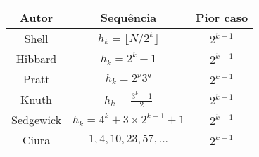 
\begin{landscape}
\begin{table}[!h]
\centering
{}
\begin{tabular}{c|c|c}
    Autor & Sequência & Pior caso \\
    \hline
    Shell \cite{shell1959high} & \( h_k = \lfloor N/2^k \rfloor \) & $2^{k-1}$ \\
    \hline
    Hibbard \cite{hibbard1963empirical} & \( h_k = 2^k - 1 \) & $2^{k-1}$ \\
    \hline
    Pratt \cite{pratt1972shellsort} & \( h_k = 2^p 3^q \) & $2^{k-1}$ \\
    \hline
    Knuth \cite{knuth1973art} & \( h_k = \frac{3^k - 1}{2} \) & $2^{k-1}$ \\
    \hline
    Sedgewick \cite{sedgewick1986new} & \( h_k = 4^k + 3 \times 2^{k-1} + 1 \) & $2^{k-1}$ \\
    \hline
    Ciura \cite{ciura2001best} & $1, 4, 10, 23, 57, ...$ & $2^{k-1}$ \\
\end{tabular}
\end{table}
\end{landscape}
